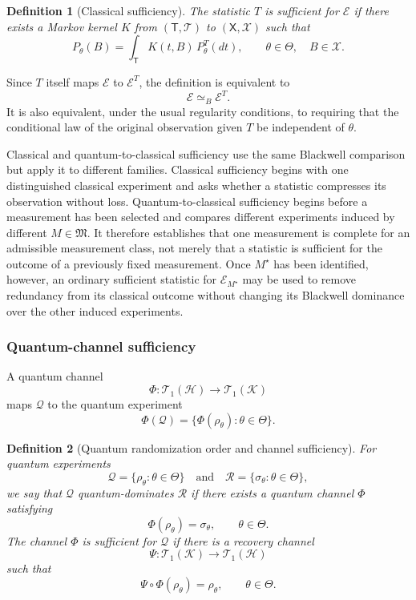 \documentclass{article}
\newtheorem{definition}{Definition}
\theoremstyle{named}
\theoremstyle{named1}
\newcommand{\cE}{\mathcal{E}}
\newcommand{\cQ}{\mathcal Q}
\newcommand{\cR}{\mathcal R}
\newcommand{\cH}{\mathcal H}
\newcommand{\cK}{\mathcal K}
\theoremstyle{plain}
\theoremstyle{remark}
\begin{document}
\begin{definition}[Classical sufficiency]
\label{def:classical-sufficiency}
The statistic $T$ is sufficient for $\cE$ if there exists a Markov kernel
$K$ from $(\mathsf T,\mathcal T)$ to $(\mathsf X,\mathcal X)$ such that
\[
    P_\theta(B)
    =
    \int_{\mathsf T}K(t,B)\,P_\theta^T(dt),
    \qquad
    \theta\in\Theta,\quad B\in\mathcal X.
\]
\end{definition}

Since $T$ itself maps $\cE$ to $\cE^T$, the definition is equivalent to
\[
    \cE\simeq_B\cE^T.
\]
It is also equivalent, under the usual regularity conditions, to requiring
that the conditional law of the original observation given $T$ be
independent of $\theta$.

Classical and quantum-to-classical sufficiency use the same Blackwell
comparison but apply it to different families. Classical sufficiency begins
with one distinguished classical experiment and asks whether a statistic
compresses its observation without loss. Quantum-to-classical sufficiency
begins before a measurement has been selected and compares
different experiments induced by different $M\in\mathfrak M$. It therefore
establishes that one measurement is complete for an admissible measurement
class, not merely that a statistic is sufficient for the outcome of a
previously fixed measurement. Once $M^\star$ has been identified, however,
an ordinary sufficient statistic for $\cE_{M^\star}$ may be used to remove
redundancy from its classical outcome without changing its Blackwell
dominance over the other induced experiments.

\subsubsection{Quantum-channel sufficiency}

A quantum channel
\[
    \Phi:\mathcal T_1(\cH)\rightarrow\mathcal T_1(\cK)
\]
maps $\cQ$ to the quantum experiment
\[
    \Phi(\cQ)=\{\Phi(\rho_\theta):\theta\in\Theta\}.
\]

\begin{definition}[Quantum randomization order and channel sufficiency]
\label{def:quantum-channel-sufficiency}
For quantum experiments
\[
    \cQ=\{\rho_\theta:\theta\in\Theta\}
    \quad\text{and}\quad
    \cR=\{\sigma_\theta:\theta\in\Theta\},
\]
we say that $\cQ$ quantum-dominates $\cR$ if there exists a quantum
channel $\Phi$ satisfying
\[
    \Phi(\rho_\theta)=\sigma_\theta,
    \qquad \theta\in\Theta.
\]
The channel $\Phi$ is sufficient for $\cQ$ if there is a recovery channel
\[
    \Psi:\mathcal T_1(\cK)\rightarrow\mathcal T_1(\cH)
\]
such that
\[
    \Psi\circ\Phi(\rho_\theta)=\rho_\theta,
    \qquad \theta\in\Theta.
\]
\end{definition}
\end{document}
